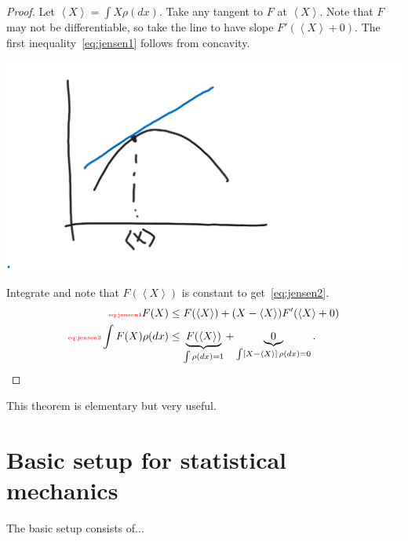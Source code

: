 \documentclass[12pt]{book}
\theoremstyle{norm}
\begin{document}
\begin{proof}
Let $\left\langle {X}\right\rangle = \int X\rho(dx)$. Take any tangent to $F$ at $\left\langle {X}\right\rangle$. 
Note that $F$ may not be differentiable, so take the line to have slope $F'(\left\langle {X}\right\rangle+0)$.
The first inequality~\eqref{eq:jensen1} follows from concavity.
\begin{center}\includegraphics[scale=.25]{images/3-2}\end{center}
Integrate and note that $F(\left\langle {X}\right\rangle)$ is constant to get~\eqref{eq:jensen2}.
\begin{align}
\label{eq:jensen1}\text{{\color{red}\tiny eq:jensen1}}
F(X) &\le F(\left\langle {X}\right\rangle) + (X-\left\langle {X}\right\rangle) F'(\left\langle {X}\right\rangle+0)\\
\label{eq:jensen2}\text{{\color{red}\tiny eq:jensen2}}
\int F(X)\rho(dx)& \le \underbrace{F(\left\langle {X}\right\rangle)}_{\int \rho(dx)=1} + \underbrace{0}_{\int [X-\left\langle {X}\right\rangle]\,\rho(dx)=0}.
\end{align}
\end{proof}
This theorem is elementary but very useful. 

\section{Basic setup for statistical mechanics}

The basic setup consists of... 
\end{document}
